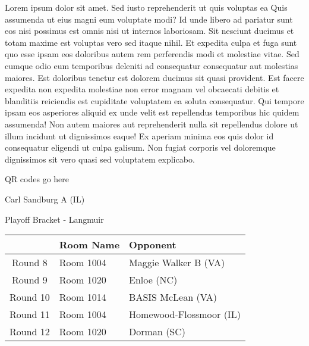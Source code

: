 \documentclass{article}%
\begin{document}
\vspace*{8pt}%
\linebreak%
\newline%
\newline%
Lorem ipsum dolor sit amet. Sed iusto reprehenderit ut quis voluptas ea Quis assumenda ut eius magni eum voluptate modi? Id unde libero ad pariatur sunt eos nisi possimus est omnis nisi ut internos laboriosam. Sit nesciunt ducimus et totam maxime est voluptas vero sed itaque nihil. Et expedita culpa et fuga sunt quo esse ipsam eos doloribus autem rem perferendis modi et molestiae vitae.\newline%
\newline%
Sed cumque odio eum temporibus deleniti ad consequatur consequatur aut molestias maiores. Est doloribus tenetur est dolorem ducimus sit quasi provident. Est facere expedita non expedita molestiae non error magnam vel obcaecati debitis et blanditiis reiciendis est cupiditate voluptatem ea soluta consequatur. Qui tempore ipsam eos asperiores aliquid ex unde velit est repellendus temporibus hic quidem assumenda!\newline%
\newline%
Non autem maiores aut reprehenderit nulla sit repellendus dolore ut illum incidunt ut dignissimos eaque! Ex aperiam minima eos quis dolor id consequatur eligendi ut culpa galisum. Non fugiat corporis vel doloremque dignissimos sit vero quasi sed voluptatem explicabo.\newline%
\newline%
%
\vspace*{30pt}%
\begin{center}%
\begin{Huge}%
QR codes go here%
\end{Huge}%
\end{center}%
\newpage%
\begin{center}%
\begin{Huge}%
Carl Sandburg A (IL)%
\end{Huge}%
\vspace*{8pt}%
\linebreak%
\begin{Large}%
Playoff Bracket {-} Langmuir%
\end{Large}%
\end{center}%
%
\begin{tabularx}{\textwidth}{|c|Y|Y|}%
\hline%
&Room Name&Opponent\\%
\hline%
Round 8&Room 1004&Maggie Walker B (VA)\\%
Round 9&Room 1020&Enloe (NC)\\%
Round 10&Room 1014&BASIS McLean (VA)\\%
Round 11&Room 1004&Homewood{-}Flossmoor (IL)\\%
Round 12&Room 1020&Dorman (SC)\\%
\hline%
\end{tabularx}%
\end{document}
